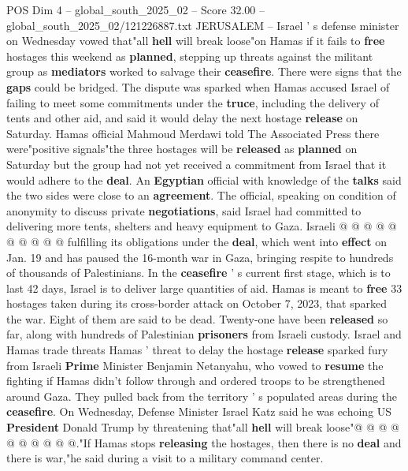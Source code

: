 \begin{textsample}{POS Dim 4 – global\_south\_2025\_02 – Score 32.00 – global\_south\_2025\_02/121226887.txt}  \label{ex:f4_pos_025}
JERUSALEM -- Israel ' s defense minister on Wednesday vowed that"all \textbf{hell} will break loose"on Hamas if it fails to \textbf{free} hostages this weekend as \textbf{planned}, stepping up threats against the militant group as \textbf{mediators} worked to salvage their \textbf{ceasefire}.
There were signs that the \textbf{gaps} could be bridged.
The dispute was sparked when Hamas accused Israel of failing to meet some commitments under the \textbf{truce}, including the delivery of tents and other aid, and said it would delay the next hostage \textbf{release} on Saturday.
Hamas official Mahmoud Merdawi told The Associated Press there were"positive signals"the three hostages will be \textbf{released} as \textbf{planned} on Saturday but the group had not yet received a commitment from Israel that it would adhere to the \textbf{deal}.
An \textbf{Egyptian} official with knowledge of the \textbf{talks} said the two sides were close to an \textbf{agreement}.
The official, speaking on condition of anonymity to discuss private \textbf{negotiations}, said Israel had committed to delivering more tents, shelters and heavy equipment to Gaza.
Israeli @ @ @ @ @ @ @ @ @ @ fulfilling its obligations under the \textbf{deal}, which went into \textbf{effect} on Jan. 19 and has paused the 16-month war in Gaza, bringing respite to hundreds of thousands of Palestinians.
In the \textbf{ceasefire} ' s current first stage, which is to last 42 days, Israel is to deliver large quantities of aid.
Hamas is meant to \textbf{free} 33 hostages taken during its cross-border attack on October 7, 2023, that sparked the war.
Eight of them are said to be dead.
Twenty-one have been \textbf{released} so far, along with hundreds of Palestinian \textbf{prisoners} from Israeli custody.
Israel and Hamas trade threats Hamas ' threat to delay the hostage \textbf{release} sparked fury from Israeli \textbf{Prime} Minister Benjamin Netanyahu, who vowed to \textbf{resume} the fighting if Hamas didn't follow through and ordered troops to be strengthened around Gaza.
They pulled back from the territory ' s populated areas during the \textbf{ceasefire}.
On Wednesday, Defense Minister Israel Katz said he was echoing US \textbf{President} Donald Trump by threatening that"all \textbf{hell} will break loose"@ @ @ @ @ @ @ @ @ @."If Hamas stops \textbf{releasing} the hostages, then there is no \textbf{deal} and there is war,"he said during a visit to a military command center.

\end{textsample}
